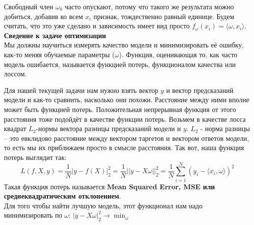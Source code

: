 Свободный член $\omega_0$ часто опускают, потому что такого же результата можно добиться, добавив ко всем $x_i$ признак, тождественно равный единице. Будем считать, что это уже сделано и зависимость имеет вид просто $f_\omega(x_i)=\langle\omega,x_i\rangle$. \\
\textbf{Сведение к задаче оптимизации} \\
Мы должны научиться измерять качество модели и минимизировать её ошибку, как-то меняя обучаемые параметры ($\omega$). Функция, оценивающая то, как часто модель ошибается, называется функцией потерь, функционалом качества или лоссом.

Для нашей текущей задачи нам нужно взять вектор $y$ и вектор предсказаний модели и как-то сравнить, насколько они похожи. Расстояние между ними вполне может быть функцией потерь. Положительная непрерывная функция от этого расстояния тоже подойдёт в качестве функции потерь. Возьмем в качестве лосса квадрат $L_2$-нормы вектора разницы предсказаний модели и $y$. $L_2$ - норма разницы – это евклидово расстояние между вектором таргетов и вектором ответов модели, то есть мы их приближаем просто в смысле расстояния.
Так вот, наша функция потерь выглядит так:
\begin{equation*}
    L(f,X,y)=\frac{1}{N}|y-f(X)|_2^2=\frac{1}{N}||y-X\omega||_2^2 =\frac{1}{N}\sum_{i=1}^{N} (y_i-\langle x_i,\omega\rangle)^2
\end{equation*}
Такая функция потерь называется \textbf{Mean Squared Error, MSE или среднеквадратическим отклонением}. \\
Для того чтобы найти лучшую модель, этот функционал нам надо минимизировать по $\omega$: $|y-X\omega|_2^2 \xrightarrow{} \min_{\omega}$

